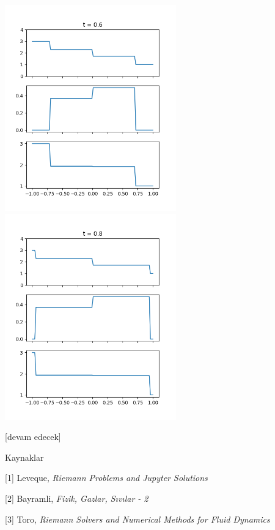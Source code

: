 \documentclass[12pt,fleqn]{article}\usepackage{../../common}
\begin{document}
\includegraphics[width=20em]{euler-roe-60.png}
\includegraphics[width=20em]{euler-roe-80.png}












[devam edecek]


Kaynaklar

[1] Leveque, {\em Riemann Problems and Jupyter Solutions}

[2] Bayramli, {\em Fizik, Gazlar, Sıvılar - 2}

[3] Toro, {\em Riemann Solvers and Numerical Methods for Fluid Dynamics}
\end{document}
